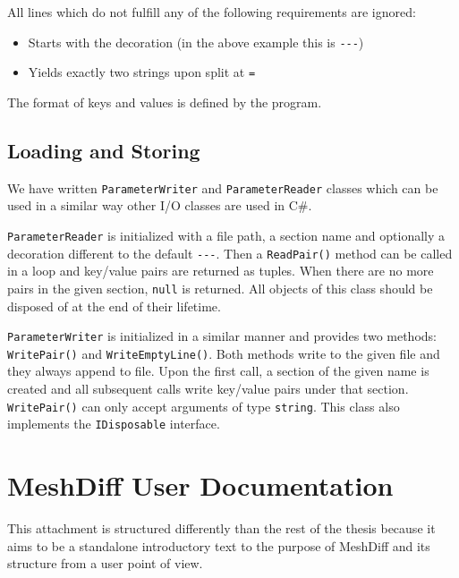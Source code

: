 All lines which do not fulfill any of the following requirements are ignored:

\begin{itemize}
\item Starts with the decoration (in the above example this is \verb+---+)
\item Yields exactly two strings upon split at \verb+=+
\end{itemize}

The format of keys and values is defined by the program.
\subsection{Loading and Storing}
\label{attch:parameter_load_store-load_store}

We have written \verb+ParameterWriter+ and \verb+ParameterReader+ classes which can be used in a similar way other I/O classes are used in C\#.

\verb+ParameterReader+ is initialized with a file path, a section name and optionally a decoration different to the default \verb+---+. Then a \verb+ReadPair()+ method can be called in a loop and key/value pairs are returned as tuples. When there are no more pairs in the given section, \verb+null+ is returned. All objects of this class should be disposed of at the end of their lifetime.

\verb+ParameterWriter+ is initialized in a similar manner and provides two methods: \verb+WritePair()+ and \verb+WriteEmptyLine()+. Both methods write to the given file and they always append to file. Upon the first call, a section of the given name is created and all subsequent calls write key/value pairs under that section. \verb+WritePair()+ can only accept arguments of type \verb+string+. This class also implements the \verb+IDisposable+ interface.


\section{MeshDiff User Documentation}
\label{attch:user_doc}

This attachment is structured differently than the rest of the thesis because it aims to be a standalone introductory text to the purpose of MeshDiff and its structure from a user point of view.

